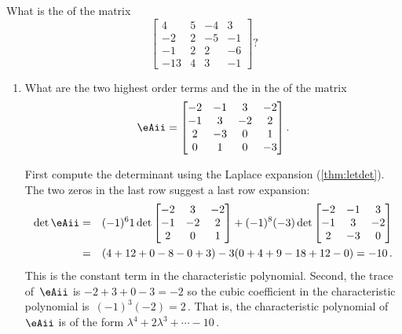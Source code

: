 \begin{activity}
What is the  of the matrix
\begin{equation*}
\begin{bmatrix} 4&5&-4&3
\\-2&2&-5&-1
\\-1&2&2&-6
\\-13&4&3&-1 \end{bmatrix}?
\end{equation*}
\end{activity}



\begin{example} 
\begin{enumerate}
\item What are the two highest order terms and the  in the  of the matrix
\begin{equation*}
\eAii=\begin{bmatrix}-2&-1&3&-2
\\-1&3&-2&2
\\2&-3&0&1
\\0&1&0&-3  \end{bmatrix}.
\end{equation*}
\begin{solution} 
First compute the determinant using the Laplace expansion (\cref{thm:letdet}).  
The two zeros in the last row suggest a last row expansion:
\begin{eqnarray*}
\det \eAii&=&(-1)^61\det\begin{bmatrix}-2&3&-2
\\-1&-2&2
\\2&0&1 \end{bmatrix}
+(-1)^8(-3)\det\begin{bmatrix}-2&-1&3
\\-1&3&-2
\\2&-3&0\end{bmatrix}
\\&=&(4+12+0-8-0+3)
-3(0+4+9-18+12-0)
=-10\,.
\end{eqnarray*}
This is the constant term in the characteristic polynomial.
Second, the trace of~\(\eAii\) is \(-2+3+0-3=-2\) so the cubic coefficient in the characteristic polynomial is~\((-1)^3(-2)=2\)\,.
That is, the characteristic polynomial of~\(\eAii\) is of the form \(\lambda^4+2\lambda^3+\cdots-10\)\,.
\end{solution}


\end{enumerate}
\end{example}
